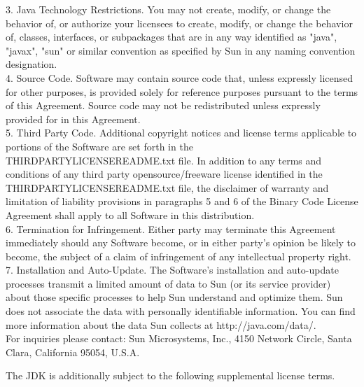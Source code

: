 {   3. Java Technology Restrictions. You may not create, modify, or
   change the behavior of, or authorize your licensees to create,
   modify, or change the behavior of, classes, interfaces, or
   subpackages that are in any way identified as "java", "javax",
   "sun" or similar convention as specified by Sun in any naming
   convention designation.
\\[4pt]
   4. Source Code. Software may contain source code that, unless
   expressly licensed for other purposes, is provided solely for
   reference purposes pursuant to the terms of this Agreement. Source
   code may not be redistributed unless expressly provided for in this
   Agreement.
\\[4pt]
   5. Third Party Code. Additional copyright notices and license terms
   applicable to portions of the Software are set forth in the
   THIRDPARTYLICENSEREADME.txt file. In addition to any terms and
   conditions of any third party opensource/freeware license
   identified in the THIRDPARTYLICENSEREADME.txt file, the disclaimer
   of warranty and limitation of liability provisions in paragraphs 5
   and 6 of the Binary Code License Agreement shall apply to all
   Software in this distribution.
\\[4pt]
   6. Termination for Infringement. Either party may terminate this
   Agreement immediately should any Software become, or in either
   party's opinion be likely to become, the subject of a claim of
   infringement of any intellectual property right.
\\[4pt]
   7. Installation and Auto-Update. The Software's installation and
   auto-update processes transmit a limited amount of data to Sun (or
   its service provider) about those specific processes to help Sun
   understand and optimize them. Sun does not associate the data with
   personally identifiable information. You can find more information
   about the data Sun collects at http://java.com/data/.
\\[4pt]
For inquiries please contact: Sun Microsystems, Inc., 4150 Network
Circle, Santa Clara, California 95054, U.S.A.
}



\setlength{\baselineskip}{\oldbaselineskip}
\noindent
The JDK is additionally subject to the following supplemental license terms.
\\

